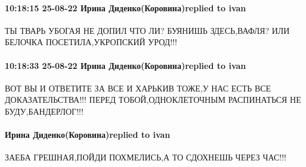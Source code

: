  
 
 
 
 

\paragraph{10:18:15 25-08-22 Ирина Диденко(Коровина)replied to ivan}

ТЫ ТВАРЬ УБОГАЯ НЕ ДОПИЛ ЧТО ЛИ? БУЯНИШЬ ЗДЕСЬ,ВАФЛЯ? ИЛИ БЕЛОЧКА
ПОСЕТИЛА,УКРОПСКИЙ УРОД!!!

\paragraph{10:18:33 25-08-22 Ирина Диденко(Коровина)replied to ivan}

ВОТ ВЫ И ОТВЕТИТЕ ЗА ВСЕ И ХАРЬКИВ ТОЖЕ,У НАС ЕСТЬ ВСЕ ДОКАЗАТЕЛЬСТВА!!! ПЕРЕД
ТОБОЙ,ОДНОКЛЕТОЧНЫМ РАСПИНАТЬСЯ НЕ БУДУ,БАНДЕРЛОГ!!!

\paragraph{Ирина Диденко(Коровина)replied to ivan}

ЗАЕБА ГРЕШНАЯ,ПОЙДИ ПОХМЕЛИСЬ,А ТО СДОХНЕШЬ ЧЕРЕЗ ЧАС!!!
